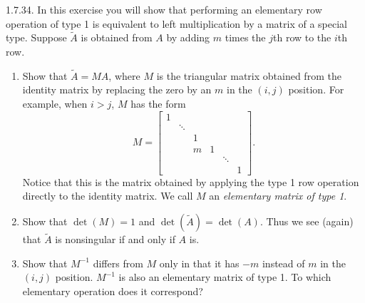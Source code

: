 \documentclass{report}
\begin{document}
    \bigbreak \noindent 
    \begin{mdframed}
        1.7.34.  In this exercise you will show that performing an elementary row operation of type 1 is equivalent to left multiplication by a matrix of a special type. Suppose $\tilde{A}$ is obtained from $A$ by adding $m$ times the $j$th row to the $i$th row.

        \begin{enumerate}[label=(\alph*)]
            \item Show that $\tilde{A} = M A$, where $M$ is the triangular matrix obtained 
                from the identity matrix by replacing the zero by an $m$ in the $(i,j)$ position. 
                For example, when $i > j$, $M$ has the form
                \[
                    M = \begin{bmatrix}
                        1 &        &        &        &  & \\
                          & \ddots &        &        &  & \\
                          &        & 1      &        &  & \\
                          &        & m      & 1      &  & \\
                          &        &        &        & \ddots& \\
                          &        &        &        &       & 1
                    \end{bmatrix}.
                \]
                Notice that this is the matrix obtained by applying the type 1 row operation 
                directly to the identity matrix. We call $M$ an \textit{elementary matrix of type 1}.

            \item Show that $\det(M) = 1$ and $\det(\tilde{A}) = \det(A)$. 
                Thus we see (again) that $\tilde{A}$ is nonsingular if and only if $A$ is.

            \item Show that $M^{-1}$ differs from $M$ only in that it has $-m$ instead of $m$ 
                in the $(i,j)$ position. $M^{-1}$ is also an elementary matrix of type 1. 
                To which elementary operation does it correspond?
        \end{enumerate}
    \end{mdframed}
\end{document}
